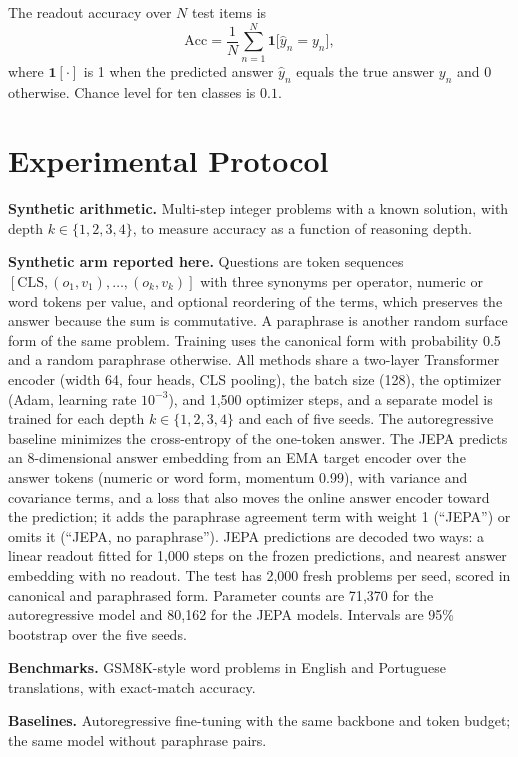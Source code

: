\documentclass[conference]{IEEEtran}
\begin{document}
The readout accuracy over $N$ test items is
\begin{equation}
\mathrm{Acc}=\frac{1}{N}\sum_{n=1}^{N}\mathbf{1}\big[\hat y_n=y_n\big],
\end{equation}
where $\mathbf{1}[\cdot]$ is 1 when the predicted answer $\hat y_n$ equals the true answer $y_n$ and 0 otherwise. Chance level for ten classes is $0.1$.

\section{Experimental Protocol}
\textbf{Synthetic arithmetic.} Multi-step integer problems with a known solution, with depth $k \in \{1,2,3,4\}$, to measure accuracy as a function of reasoning depth.

\textbf{Synthetic arm reported here.} Questions are token sequences $[\mathrm{CLS},(o_1,v_1),\dots,(o_k,v_k)]$ with three synonyms per operator, numeric or word tokens per value, and optional reordering of the terms, which preserves the answer because the sum is commutative. A paraphrase is another random surface form of the same problem. Training uses the canonical form with probability 0.5 and a random paraphrase otherwise. All methods share a two-layer Transformer encoder (width 64, four heads, CLS pooling), the batch size (128), the optimizer (Adam, learning rate $10^{-3}$), and 1{,}500 optimizer steps, and a separate model is trained for each depth $k\in\{1,2,3,4\}$ and each of five seeds. The autoregressive baseline minimizes the cross-entropy of the one-token answer. The JEPA predicts an 8-dimensional answer embedding from an EMA target encoder over the answer tokens (numeric or word form, momentum 0.99), with variance and covariance terms, and a loss that also moves the online answer encoder toward the prediction; it adds the paraphrase agreement term with weight 1 (``JEPA'') or omits it (``JEPA, no paraphrase''). JEPA predictions are decoded two ways: a linear readout fitted for 1{,}000 steps on the frozen predictions, and nearest answer embedding with no readout. The test has 2{,}000 fresh problems per seed, scored in canonical and paraphrased form. Parameter counts are 71{,}370 for the autoregressive model and 80{,}162 for the JEPA models. Intervals are 95\% bootstrap over the five seeds.

\textbf{Benchmarks.} GSM8K-style word problems in English and Portuguese translations, with exact-match accuracy.

\textbf{Baselines.} Autoregressive fine-tuning with the same backbone and token budget; the same model without paraphrase pairs.
\end{document}
